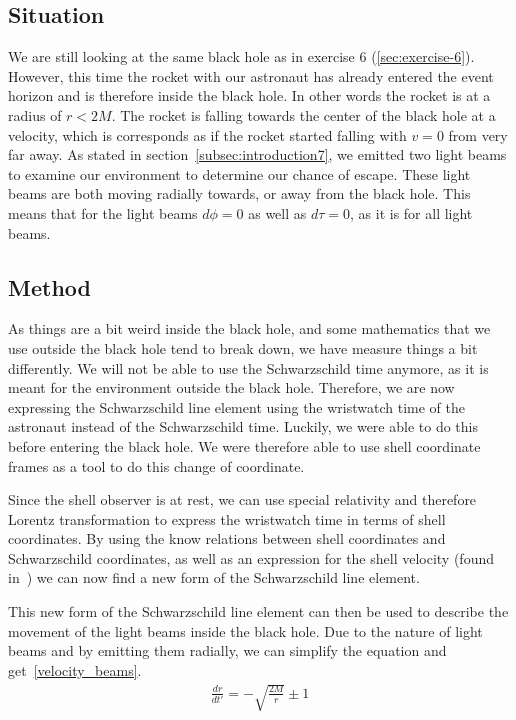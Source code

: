 \documentclass[reprint,english,notitlepage]{revtex4-2}
\begin{document}
    \subsection{Situation}\label{subsec:situation7}
        We are still looking at the same black hole as in exercise 6 (\ref{sec:exercise-6}).
        However, this time the rocket with our astronaut has already entered the event horizon and is therefore inside the black hole.
        In other words the rocket is at a radius of $r < 2M$.
        The rocket is falling towards the center of the black hole at a velocity, which is corresponds as if the rocket started falling with $v = 0$ from very far away.
        As stated in section~\ref{subsec:introduction7}, we emitted two light beams to examine our environment to determine our chance of escape.
        These light beams are both moving radially towards, or away from the black hole.
        This means that for the light beams $d\phi = 0$ as well as $d\tau = 0$, as it is for all light beams.

    \subsection{Method}\label{subsec:method7}
        As things are a bit weird inside the black hole, and some mathematics that we use outside the black hole tend to break down, we have measure things a bit differently.
        We will not be able to use the Schwarzschild time anymore, as it is meant for the environment outside the black hole.
        Therefore, we are now expressing the Schwarzschild line element using the wristwatch time of the astronaut instead of the Schwarzschild time.
        Luckily, we were able to do this before entering the black hole.
        We were therefore able to use shell coordinate frames as a tool to do this change of coordinate.

        Since the shell observer is at rest, we can use special relativity and therefore Lorentz transformation to express the wristwatch time in terms of shell coordinates.
        By using the know relations between shell coordinates and Schwarzschild coordinates, as well as an expression for the shell velocity (found in~\parencite[][page 7]{lecture2d}) we can now find a new form of the Schwarzschild line element.

        This new form of the Schwarzschild line element can then be used to describe the movement of the light beams inside the black hole.
        Due to the nature of light beams and by emitting them radially, we can simplify the equation and get~\eqref{velocity_beams}.
        \begin{align}
            \frac{dr}{dt'} = -\sqrt{\frac{2M}{r}} \pm 1 \label{velocity_beams}
        \end{align}
\end{document}
